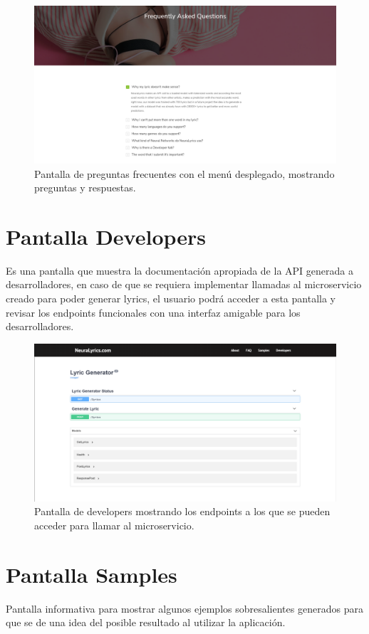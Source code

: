 \documentclass[12pt, a4paper, titlepage]{article}
\begin{document}
		\begin{figure}[H] 
		\includegraphics[width=13.5cm]{./Imagenes/Capturas/pfaqopen.png}
		\centering \caption{Pantalla de preguntas frecuentes con el menú desplegado, mostrando preguntas y respuestas.}
		\end{figure}
	
		\section{Pantalla Developers}
		Es una pantalla que muestra la documentación apropiada de la API generada a desarrolladores, en caso de que se requiera implementar llamadas al microservicio creado para poder generar lyrics, el usuario podrá acceder a esta pantalla y revisar los endpoints funcionales con una interfaz amigable para los desarrolladores.
		
		\begin{figure}[H] 
			\includegraphics[width=13.5cm]{./Imagenes/Capturas/pdev.png}
			\centering \caption{Pantalla de developers mostrando los endpoints a los que se pueden acceder para llamar al microservicio.}
		\end{figure}
		
		\section{Pantalla Samples}
		Pantalla informativa para mostrar algunos ejemplos sobresalientes generados para que se de una idea del posible resultado al utilizar la aplicación.
		
\end{document}
